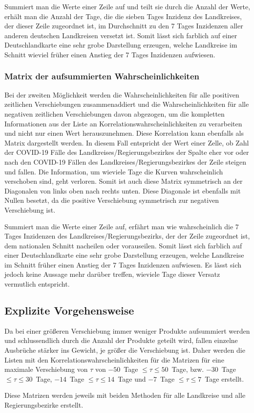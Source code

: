 Summiert man die Werte einer Zeile auf und teilt sie durch die Anzahl der Werte, erhält man die Anzahl der Tage, die die sieben Tages Inzidenz des Landkreises, der dieser Zeile zugeordnet ist, im Durchschnitt zu den 7 Tages Inzidenzen aller anderen deutschen Landkreisen versetzt ist.
Somit lässt sich farblich auf einer Deutschlandkarte eine sehr grobe Darstellung erzeugen, welche Landkreise im Schnitt wieviel früher einen Anstieg der 7 Tages Inzidenzen aufwiesen.

\subsubsection{Matrix der aufsummierten Wahrscheinlichkeiten}
Bei der zweiten Möglichkeit werden die Wahrscheinlichkeiten für alle positiven zeitlichen Verschiebungen zusammenaddiert und die Wahrscheinlichkeiten für alle negativen zeitlichen Verschiebungen davon abgezogen, 
um die kompletten Informationen aus der Liste an Korrelationswahrscheinlichkeiten zu verarbeiten und nicht nur einen Wert herauszunehmen. Diese Korrelation kann ebenfalls als Matrix dargestellt werden. In diesem Fall entspricht der Wert einer Zelle, ob Zahl der COVID-19 Fälle des Landkreises/Regierungsbezirkes der Spalte eher vor oder nach den COVID-19 Fällen des Landkreises/Regierungsbezirkes der Zeile steigen und fallen. Die Information, um wieviele Tage die Kurven wahrscheinlich verschoben sind, geht verloren. Somit ist auch diese Matrix symmetrisch an der Diagonalen von links oben nach rechts unten. Diese Diagonale ist ebenfalls mit Nullen besetzt, da die positive Verschiebung symmetrisch zur negativen Verschiebung ist.

Summiert man die Werte einer Zeile auf, erfährt man wie wahrscheinlich die 7 Tages Inzidenzen des Landkreises/Regierungsbezirks, der der Zeile zugeordnet ist, dem nationalen Schnitt nacheilen oder vorauseilen.
Somit lässt sich farblich auf einer Deutschlandkarte eine sehr grobe Darstellung erzeugen, welche Landkreise im Schnitt früher einen Anstieg der 7 Tages Inzidenzen aufwiesen. Es lässt sich jedoch keine Aussage mehr darüber treffen, wieviele Tage dieser Versatz vermutlich entspricht.


\subsection{Explizite Vorgehensweise}
Da bei einer größeren Verschiebung immer weniger Produkte aufsummiert werden und schlussendlich durch die Anzahl der Produkte geteilt wird, fallen einzelne Ausbrüche stärker ins Gewicht, je größer die Verschiebung ist. Daher werden die Listen mit den Korrelationswahrscheinlichkeiten für die Matrizen für eine maximale Verschiebung von $\tau$ von $-50$~Tage $\leq\tau\leq50$~Tage, bzw. $-30$~Tage $\leq\tau\leq30$~Tage, $-14$~Tage $\leq\tau\leq14$~Tage und $-7$~Tage $\leq\tau\leq7$~Tage erstellt.

Diese Matrizen werden jeweils mit beiden Methoden für alle Landkreise und alle Regierungsbezirke erstellt.